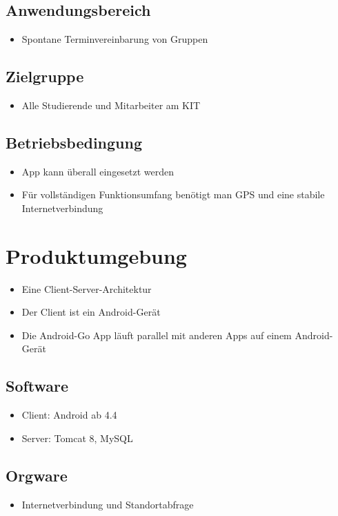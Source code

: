 \documentclass{scrartcl}
\begin{document}
	\subsection{Anwendungsbereich}
	\begin{itemize}	        
		\item Spontane Terminvereinbarung von Gruppen
	\end{itemize}
	\subsection{Zielgruppe}
	\begin{itemize}	        
		\item Alle Studierende und Mitarbeiter am KIT
	\end{itemize}
	\subsection{Betriebsbedingung}
	\begin{itemize}	        
		\item App kann überall eingesetzt werden
		\item Für vollständigen Funktionsumfang benötigt man GPS und eine stabile Internetverbindung
	\end{itemize}
	
	\newpage
	
	
	\section{Produktumgebung}
	\begin{itemize}	        
		\item Eine \gls{Client-Server-Architektur}
		\item Der \gls{Client} ist ein Android-Gerät
		\item Die Android-Go App läuft parallel mit anderen Apps auf einem Android-Gerät
	\end{itemize}
	\subsection{Software}
	\begin{itemize}	        
		\item \gls{Client}: \gls{Android} ab 4.4
		\item \gls{Server}: \gls{Tomcat} 8, MySQL
	\end{itemize}	
	\subsection{Orgware}
	\begin{itemize}	        
		\item Internetverbindung und Standortabfrage
	\end{itemize}
\end{document}
